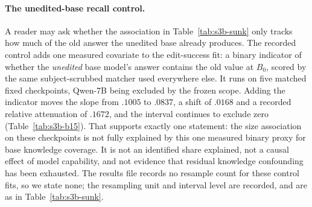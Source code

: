 \documentclass[letterpaper]{article}
\begin{document}
\paragraph{The unedited-base recall control.}  A reader may ask whether the
association in Table~\ref{tab:s3b-sunk} only tracks how much of the old answer
the unedited base already produces.  The recorded control adds one measured
covariate to the edit-success fit: a binary indicator of whether the
\emph{unedited} base model's answer contains the old value at \(B_0\), scored by
the same subject-scrubbed matcher used everywhere else.  It runs on five matched
fixed checkpoints, Qwen-7B being excluded by the frozen scope.  Adding the
indicator moves the slope from \(.1005\) to \(.0837\), a shift of \(.0168\) and a
recorded relative attenuation of \(.1672\), and the interval continues to
exclude zero (Table~\ref{tab:s3b-b15}).  That supports exactly one statement:
the size association on these checkpoints is not fully explained by this one
measured binary proxy for base knowledge coverage.  It is not an identified
share explained, not a causal effect of model capability, and not evidence that
residual knowledge confounding has been exhausted.  The results file records no
resample count for these control fits, so we state none; the resampling unit and
interval level are recorded, and are as in Table~\ref{tab:s3b-sunk}.
\end{document}

